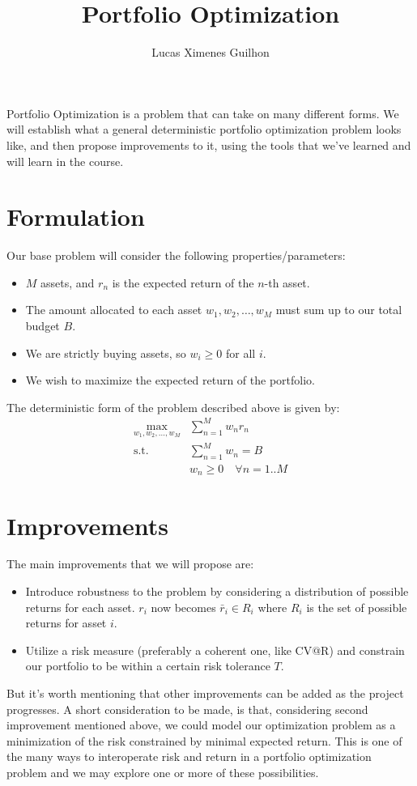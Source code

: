 \documentclass{article}
\title{Portfolio Optimization}
\author{Lucas Ximenes Guilhon}
\begin{document}
\maketitle

Portfolio Optimization is a problem that can take on many different forms. We will establish what a general deterministic portfolio optimization problem looks like, and then
propose improvements to it, using the tools that we've learned and will learn in the course.
\section*{Formulation}
Our base problem will consider the following properties/parameters:
\begin{itemize}
\item $M$ assets, and $r_n$ is the expected return of the $n$-th asset.
\item The amount allocated to each asset $w_1, w_2, \dots, w_M$ must sum up to our total budget $B$.
\item We are strictly buying assets, so $w_i \geq 0$ for all $i$.
\item We wish to maximize the expected return of the portfolio.
\end{itemize}
The deterministic form of the problem described above is given by:
\begin{equation}
  \begin{aligned}
  \max_{w_1, w_2, \dots, w_M} & \sum_{n=1}^M w_n r_n\\
  \textrm{s.t.} \quad & \sum_{n=1}^M w_n = B\\
    & w_n \geq 0 \quad \forall n=1..M
  \end{aligned}
\end{equation}
\section*{Improvements}
The main improvements that we will propose are:
\begin{itemize}
  \item Introduce robustness to the problem by considering a distribution of possible returns for each asset. $r_i$ now becomes $\bar{r}_i \in R_i$ where $R_i$ is the set of possible returns for asset $i$.
  \item Utilize a risk measure (preferably a coherent one, like CV@R) and constrain our portfolio to be within a certain risk tolerance $T$.
\end{itemize}
But it's worth mentioning that other improvements can be added as the project progresses. A short consideration to be made, is that, considering second improvement mentioned above,
we could model our optimization problem as a minimization of the risk constrained by minimal expected return. This is one of the many ways to interoperate risk and return in a portfolio optimization problem
and we may explore one or more of these possibilities.
\end{document}
